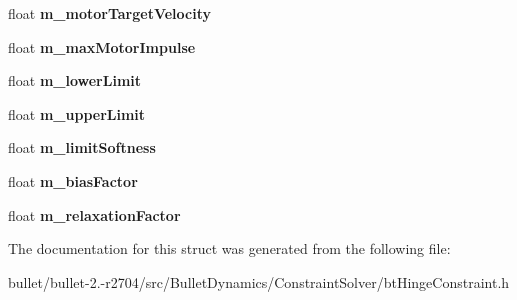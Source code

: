\begin{DoxyCompactItemize}
\item 
\hypertarget{structbt_hinge_constraint_float_data_a872ef33a0c8c264bc5ced613d11ec476}{float {\bfseries m\+\_\+motor\+Target\+Velocity}}\label{structbt_hinge_constraint_float_data_a872ef33a0c8c264bc5ced613d11ec476}

\item 
\hypertarget{structbt_hinge_constraint_float_data_a28ea76cb37bdd44e6b157596ceb53d91}{float {\bfseries m\+\_\+max\+Motor\+Impulse}}\label{structbt_hinge_constraint_float_data_a28ea76cb37bdd44e6b157596ceb53d91}

\item 
\hypertarget{structbt_hinge_constraint_float_data_a2ba60a4d38470a3ee2cf74e97fd2de11}{float {\bfseries m\+\_\+lower\+Limit}}\label{structbt_hinge_constraint_float_data_a2ba60a4d38470a3ee2cf74e97fd2de11}

\item 
\hypertarget{structbt_hinge_constraint_float_data_a1b9f4b9becfb4c857d75ec4022bc8279}{float {\bfseries m\+\_\+upper\+Limit}}\label{structbt_hinge_constraint_float_data_a1b9f4b9becfb4c857d75ec4022bc8279}

\item 
\hypertarget{structbt_hinge_constraint_float_data_ad7f6c747ce281980911a9fa5481cb678}{float {\bfseries m\+\_\+limit\+Softness}}\label{structbt_hinge_constraint_float_data_ad7f6c747ce281980911a9fa5481cb678}

\item 
\hypertarget{structbt_hinge_constraint_float_data_a4d89d4b4715a4852f9cfa454328e627a}{float {\bfseries m\+\_\+bias\+Factor}}\label{structbt_hinge_constraint_float_data_a4d89d4b4715a4852f9cfa454328e627a}

\item 
\hypertarget{structbt_hinge_constraint_float_data_ab46eef3a11248e144d81527545557779}{float {\bfseries m\+\_\+relaxation\+Factor}}\label{structbt_hinge_constraint_float_data_ab46eef3a11248e144d81527545557779}

\end{DoxyCompactItemize}


The documentation for this struct was generated from the following file\+:\begin{DoxyCompactItemize}
\item 
bullet/bullet-\/2.-\/r2704/src/\+Bullet\+Dynamics/\+Constraint\+Solver/bt\+Hinge\+Constraint.\+h\end{DoxyCompactItemize}
